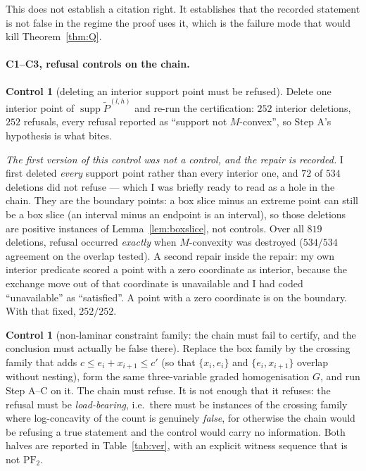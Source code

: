 \documentclass[11pt]{article}
\theoremstyle{plain}
\theoremstyle{definition}
\newtheorem{control}[theorem]{Control}
\DeclareMathOperator{\supp}{supp}
\newcommand{\PFtwo}{\mathrm{PF}_2}
\newcommand{\Pt}{\widetilde P}
\begin{document}
This does not establish a citation right. It establishes that the recorded statement is
not false in the regime the proof uses it, which is the failure mode that would kill
Theorem~\ref{thm:Q}.

\paragraph{C1--C3, refusal controls on the chain.}
\begin{control}[deleting an interior support point must be refused]
Delete one interior point of $\supp\Pt^{(l,h)}$ and re-run the certification: $252$
interior deletions, $252$ refusals, every refusal reported as ``support not $M$-convex'',
so Step A's hypothesis is what bites.

\emph{The first version of this control was not a control, and the repair is recorded.} I
first deleted \emph{every} support point rather than every interior one, and $72$ of $534$
deletions did not refuse --- which I was briefly ready to read as a hole in the chain. They
are the boundary points: a box slice minus an extreme point can still be a box slice (an
interval minus an endpoint is an interval), so those deletions are positive instances of
Lemma~\ref{lem:boxslice}, not controls. Over all $819$ deletions, refusal occurred
\emph{exactly} when $M$-convexity was destroyed ($534/534$ agreement on the overlap tested).
A second repair inside the repair: my own interior predicate scored a point with a zero
coordinate as interior, because the exchange move out of that coordinate is unavailable and
I had coded ``unavailable'' as ``satisfied''. A point with a zero coordinate is on the
boundary. With that fixed, $252/252$.
\end{control}
\begin{control}[non-laminar constraint family: the chain must fail to certify, and the
conclusion must actually be false there]
Replace the box family by the crossing family that adds $c\le e_i+x_{i+1}\le c'$ (so that
$\{x_i,e_i\}$ and $\{e_i,x_{i+1}\}$ overlap without nesting), form the same three-variable
graded homogenisation $G$, and run Step A--C on it. The chain must refuse. It is not enough
that it refuses: the refusal must be \emph{load-bearing}, i.e.\ there must be instances of
the crossing family where log-concavity of the count is genuinely \emph{false}, for
otherwise the chain would be refusing a true statement and the control would carry no
information. Both halves are reported in Table~\ref{tab:ver}, with an explicit witness
sequence that is not $\PFtwo$.
\end{control}
\end{document}
